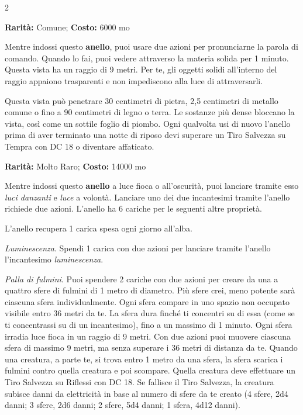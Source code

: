 \begin{multicols}{2}

\textbf{Rarità:} Comune; \textbf{Costo:} 6000 mo

Mentre indossi questo \textbf{anello}, puoi usare due azioni per pronunciarne la parola di comando. Quando lo fai, puoi vedere attraverso la materia solida per 1 minuto. Questa vista ha un raggio di 9 metri. Per te, gli oggetti solidi all'interno del raggio appaiono trasparenti e non impediscono alla luce di attraversarli.

Questa vista può penetrare 30 centimetri di pietra, 2,5 centimetri di metallo comune o fino a 90 centimetri di legno o terra. Le sostanze più dense bloccano la vista, così come un sottile foglio di piombo. Ogni qualvolta usi di nuovo l'anello prima di aver terminato una notte di riposo devi superare un Tiro Salvezza su Tempra con DC 18 o diventare affaticato.


\textbf{Rarità:} Molto Raro; \textbf{Costo:} 14000 mo

Mentre indossi questo \textbf{anello} a luce fioca o all'oscurità, puoi lanciare tramite esso \emph{luci danzanti} e \emph{luce} a volontà. Lanciare uno dei due incantesimi tramite l'anello richiede due azioni. L'anello ha 6 cariche per le seguenti altre proprietà.

L'anello recupera 1 carica spesa ogni giorno all'alba.

\emph{Luminescenza}. Spendi 1 carica con due azioni per lanciare tramite l'anello l'incantesimo \emph{luminescenza}.

\emph{Palla di fulmini}. Puoi spendere 2 cariche con due azioni per creare da una a quattro sfere di fulmini di 1 metro di diametro. Più sfere crei, meno potente sarà ciascuna sfera individualmente.
Ogni sfera compare in uno spazio non occupato visibile entro 36 metri da te. La sfera dura finché ti concentri su di essa (come se ti concentrassi su di un incantesimo), fino a un massimo di 1 minuto. Ogni sfera irradia luce fioca in un raggio di 9 metri. Con due azioni puoi muovere ciascuna sfera di massimo 9 metri, ma senza superare i 36 metri di distanza da te. Quando una creatura, a parte te, si trova entro 1 metro da una sfera, la sfera scarica i fulmini contro quella creatura e poi scompare. Quella creatura deve effettuare un Tiro Salvezza su Riflessi con DC 18. Se fallisce il Tiro Salvezza, la creatura subisce danni da elettricità in base al numero di sfere da te creato (4 sfere, 2d4 danni; 3 sfere, 2d6 danni; 2 sfere, 5d4 danni; 1 sfera, 4d12 danni).


\end{multicols}
